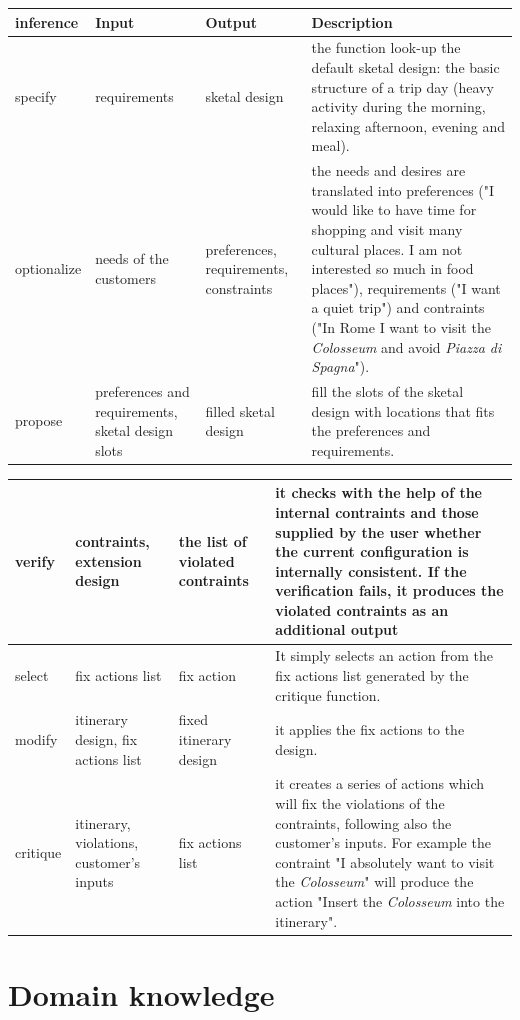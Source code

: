 \documentclass[11pt]{article} %
\begin{document}
\noindent
\begin{tabularx}{\textwidth}{| X | X | X | X |}
  \hline
inference		& Input	& Output 	& Description \\ \hline \hline
specify		& requirements	& sketal design		& the function look-up the default sketal design: the basic structure of a trip day (heavy activity during the morning, relaxing afternoon, evening and meal).
\\ \hline 
   optionalize	& needs of the customers		& preferences, requirements, constraints	& the needs and desires are translated into preferences ("I would like to have time for shopping and visit many cultural places. I am not interested so much in food places"), requirements ("I want a quiet trip") and contraints ("In Rome I want to visit the \emph{Colosseum} and avoid \emph{Piazza di Spagna}"). 
\\ \hline
propose	& preferences and requirements, sketal design slots		& filled sketal design	& fill the slots of the sketal design with locations that fits the preferences and requirements.
\\ \hline
\end{tabularx}
\noindent
\begin{tabularx}{\textwidth}{| X | X | X | X |}
\hline
verify		& contraints, extension design	& the list of violated contraints	& it checks with the help of the internal contraints and those supplied by the user whether the current configuration is internally consistent. If the verification fails, it produces the violated contraints as an additional output
\\ \hline
select 	& fix actions list		& fix action		& It simply selects an action from the fix actions list generated by the critique function.
\\ \hline
modify	& itinerary design, fix actions list		& fixed itinerary design		& it applies the fix actions to the design.
\\ \hline
critique	& itinerary, violations, customer's inputs	& fix actions list		& it creates a series of actions which will fix the violations of the contraints, following also the customer's inputs. For example the contraint "I absolutely want to visit the \emph{Colosseum}" will produce the action "Insert the \emph{Colosseum} into the itinerary".
\\ \hline
\end{tabularx}



\section{Domain knowledge}
\end{document}
